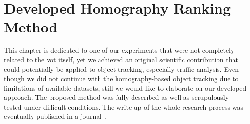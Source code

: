 \chapter{Developed Homography Ranking Method}
\label{chap:HomographyRanking}

This chapter is dedicated to one of our experiments that were not completely related to the \gls{vot} itself, yet we achieved an original scientific contribution that could potentially be applied to object tracking, especially traffic analysis. Even though we did not continue with the homography-based object tracking due to limitations of available datasets, still we would like to elaborate on our developed approach. The proposed method was fully described as well as scrupulously tested under difficult conditions. The write-up of the whole research process was eventually published in a journal~\cite{ondrasovic2021homography}.






